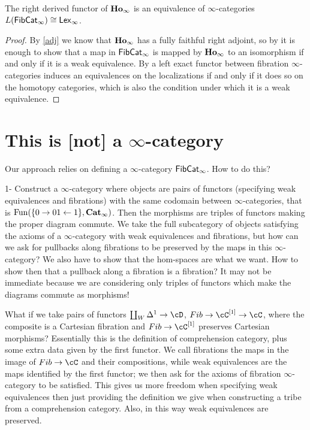 \documentclass[a4paper,12pt,openany]{scrartcl}
\begin{document}
\begin{prop}
  The right derived functor of $\operatorname{\mathbf{Ho}_\infty}$ is an equivalence of $\infty$-categories
  $L(\operatorname{\mathsf{FibCat}}_\infty)\cong\operatorname{\mathsf{Lex}_\infty}$.
\end{prop}
\begin{proof}
  By \ref{adj} we know that $\operatorname{\mathbf{Ho}_\infty}$ has a fully faithful right adjoint, so by
  \cite[Prop.\ 7.1.18]{Cis19} it is enough to show that a map in
  $\operatorname{\mathsf{FibCat}}_\infty$ is mapped by $\operatorname{\mathbf{Ho}_\infty}$ to an isomorphism if and only if it is a
  weak equivalence. By \cite[Prop.\ 7.6.11]{Cis19} a left exact functor between
  fibration $\infty$-categories induces an equivalences on the localizations if
  and only if it does so on the homotopy categories, which is also the condition
  under which it is a weak equivalence.
\end{proof}

\section{This is [not] a $\infty$-category}

Our approach relies on defining a $\infty$-category $\operatorname{\mathsf{FibCat}}_\infty$. How to do this?

1- Construct a $\infty$-category where objects are pairs of functors (specifying weak equivalences and fibrations) with the same codomain between $\infty$-categories, that is $\operatorname{Fun}(\{0\rightarrow 01\leftarrow 1\},\operatorname{\mathbf{Cat}}_\infty)$. Then the morphisms are triples of functors making the proper diagram commute. We take the full subcategory of objects satisfying the axioms of a $\infty$-category with weak equivalences and fibrations, but how can we ask for pullbacks along fibrations to be preserved by the maps in this $\infty$-category? We also have to show that the hom-spaces are what we want. How to show then that a pullback along a fibration is a fibration? It may not be immediate because we are considering only triples of functors which make the diagrams commute as morphisms!

What if we take pairs of functors $\coprod_W\Delta^1\rightarrow\cD$,
$Fib\rightarrow\cC^{[1]}\rightarrow\cC$, where the composite is a Cartesian
fibration and $Fib\rightarrow\cC^{[1]}$ preserves Cartesian morphisms?
Essentially this is the definition of comprehension category, plus some extra
data given by the first functor. We call fibrations the maps in the image of
$Fib\rightarrow\cC$ and their compositions, while weak equivalences are the
maps identified by the first functor; we then ask for the axioms of fibration
$\infty$-category to be satisfied. This gives us more freedom when specifying
weak equivalences then just providing the definition we give when constructing a
tribe from a comprehension category. Also, in this way weak equivalences are
preserved.
\end{document}
